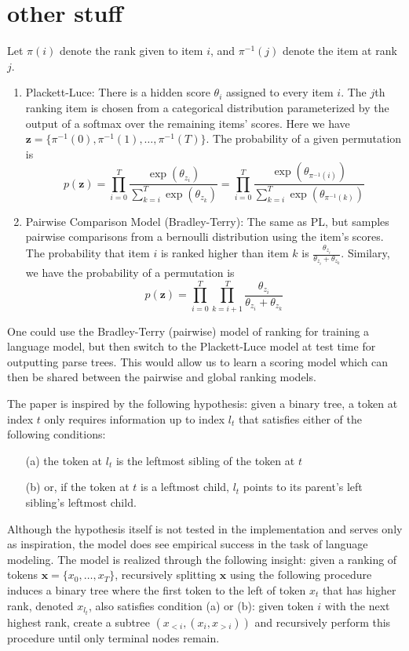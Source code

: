 \documentclass{article}
\newcommand{\bx}{\mathbf{x}}
\newcommand{\bz}{\mathbf{z}}
\begin{document}
\section{other stuff}
Let $\pi(i)$ denote the rank given to item $i$, and $\pi^{-1}(j)$ denote the 
item at rank $j$.
\begin{enumerate}
\item Plackett-Luce:
There is a hidden score $\theta_i$ assigned to every item $i$.
The $j$th ranking item is chosen from a categorical distribution 
parameterized by the output of a softmax over the remaining items' scores.
Here we have $\bz = \{\pi^{-1}(0),\pi^{-1}(1),\ldots,\pi^{-1}(T)\}$.
The probability of a given permutation is
$$
p(\bz)
= \prod_{i=0}^T\frac{\exp(\theta_{z_i})}{\sum_{k=i}^T \exp(\theta_{z_k})}
= \prod_{i=0}^T\frac{\exp(\theta_{\pi^{-1}(i)})}{\sum_{k=i}^T \exp(\theta_{\pi^{-1}(k)})}
$$
\item Pairwise Comparison Model (Bradley-Terry):
The same as PL, but samples pairwise comparisons from a bernoulli distribution
using the item's scores.
The probability that item $i$ is ranked higher than item $k$ is 
$\frac{\theta_{z_i}}{\theta_{z_i}+\theta_{z_k}}$.
Similary, we have the probability of a permutation is
$$
p(\bz) 
= \prod_{i=0}^T\prod_{k=i+1}^T\frac{\theta_{z_i}}{\theta_{z_i}+\theta_{z_k}}
$$
\end{enumerate}
One could use the Bradley-Terry (pairwise)
model of ranking for training a language model,
but then switch to the Plackett-Luce model at test time for outputting parse trees.
This would allow us to learn a scoring model which can then be shared between the 
pairwise and global ranking models.

The paper is inspired by the following hypothesis:
given a binary tree, a token at index $t$ only requires information up to index $l_t$ that satisfies
either of the following conditions:
\begin{itemize}
\item[(a)] the token at $l_t$ is the leftmost sibling of the token at $t$
\item[(b)] or, if the token at $t$ is a leftmost child, $l_t$ points to its parent's left sibling's leftmost child.
\end{itemize}
Although the hypothesis itself is not tested in the implementation and serves only as inspiration,
the model does see empirical success in the task of language modeling.
The model is realized through the following insight: given a ranking of tokens $\bx = \{x_0,\ldots,x_T\}$,
recursively splitting $\bx$ using the following procedure induces a binary tree where the first token to the left
of token $x_t$ that has higher rank, denoted $x_{l_t}$, also satisfies condition (a) or (b):
given token $i$ with the next highest rank, create a subtree $(x_{<i}, (x_i, x_{>i}))$ and
recursively perform this procedure until only terminal nodes remain.
\end{document}
